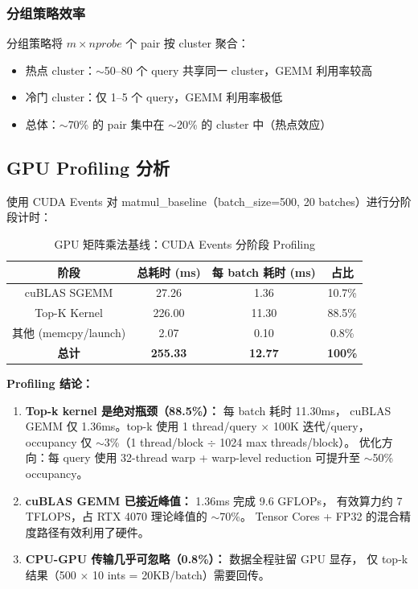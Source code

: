 \documentclass[UTF8,a4paper,10pt]{ctexart}
\begin{document}
\subsubsection{分组策略效率}

分组策略将 $m \times nprobe$ 个 pair 按 cluster 聚合：
\begin{itemize}[itemsep=0pt]
\item 热点 cluster：$\sim$50--80 个 query 共享同一 cluster，GEMM 利用率较高
\item 冷门 cluster：仅 1--5 个 query，GEMM 利用率极低
\item 总体：$\sim$70\% 的 pair 集中在 $\sim$20\% 的 cluster 中（热点效应）
\end{itemize}

\subsection{GPU Profiling 分析}

使用 CUDA Events 对 matmul\_baseline（batch\_size=500, 20 batches）进行分阶段计时：

\begin{table}[H]
\centering
\caption{GPU 矩阵乘法基线：CUDA Events 分阶段 Profiling}
\label{tab:perf-breakdown}
\begin{tabular}{cccc}
\toprule
阶段 & 总耗时 (ms) & 每 batch 耗时 (ms) & 占比 \\
\midrule
cuBLAS SGEMM & 27.26 & 1.36 & 10.7\% \\
Top-K Kernel & 226.00 & 11.30 & 88.5\% \\
其他 (memcpy/launch) & 2.07 & 0.10 & 0.8\% \\
\midrule
\textbf{总计} & \textbf{255.33} & \textbf{12.77} & \textbf{100\%} \\
\bottomrule
\end{tabular}
\end{table}

\textbf{Profiling 结论：}

\begin{enumerate}[itemsep=0pt]
\item \textbf{Top-k kernel 是绝对瓶颈（88.5\%）：} 每 batch 耗时 11.30ms，
cuBLAS GEMM 仅 1.36ms。top-k 使用 1 thread/query $\times$ 100K 迭代/query，
occupancy 仅 $\sim$3\%（1 thread/block $\div$ 1024 max threads/block）。
优化方向：每 query 使用 32-thread warp + warp-level reduction 可提升至 $\sim$50\% occupancy。

\item \textbf{cuBLAS GEMM 已接近峰值：} 1.36ms 完成 9.6 GFLOPs，
有效算力约 7 TFLOPS，占 RTX 4070 理论峰值的 $\sim$70\%。
Tensor Cores + FP32 的混合精度路径有效利用了硬件。

\item \textbf{CPU-GPU 传输几乎可忽略（0.8\%）：} 数据全程驻留 GPU 显存，
仅 top-k 结果（500 $\times$ 10 ints = 20KB/batch）需要回传。
\end{enumerate}
\end{document}
